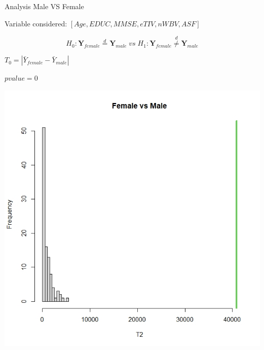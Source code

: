 \documentclass{beamer}
\begin{document}
	
	
	\begin{frame}{Analysis Male VS Female}
		\vspace{0.1cm}
	
	\begin{small}	Variable considered: $[Age,EDUC,MMSE,eTIV,nWBV,ASF]$ \end{small}
		\vspace{-0.2cm}
		
	$$
	H_0: \mathbf{Y}_{female} \overset{d}{=} \mathbf{Y}_{male}\;vs\;H_1:\mathbf{Y}_{female} \overset{d}{\neq} \mathbf{Y}_{male}
	$$
	 
	
	\begin{multicols}{2}
		
	\vspace{0.5cm}
	$T_0 = |\bar{Y}_{female} - \bar{Y}_{male}|$	
	
	\vspace{1cm}
	$pvalue= 0 $
	\columnbreak

	\begin{center}
		\includegraphics[width=0.95\columnwidth]{histmvsf.jpeg}
	\end{center}
	\end{multicols}

	
	\end{frame}
\end{document}
